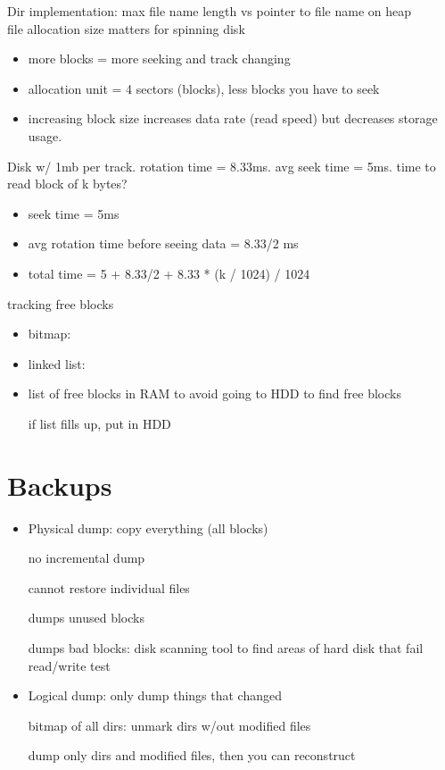 \documentclass[11pt]{article}
\begin{document}
Dir implementation: max file name length vs pointer to file name on heap \\

file allocation size matters for spinning disk
\begin{itemize}
    \item more blocks = more seeking and track changing
    \item allocation unit = 4 sectors (blocks), less blocks you have to seek
    \item increasing block size increases data rate (read speed) but decreases storage usage.
\end{itemize}

Disk w/ 1mb per track. rotation time = 8.33ms. avg seek time = 5ms. time to read block of k bytes?
\begin{itemize}
    \item seek time = 5ms
    \item avg rotation time before seeing data = 8.33/2 ms
    \item total time = 5 + 8.33/2 + 8.33 * (k / 1024) / 1024\\
\end{itemize}

tracking free blocks
\begin{itemize}
    \item bitmap:
    \item linked list: 
    \item list of free blocks in RAM to avoid going to HDD to find free blocks

        if list fills up, put in HDD
\end{itemize}


\section{Backups}
\begin{itemize}
    \item Physical dump: copy everything (all blocks)

        no incremental dump

        cannot restore individual files

        dumps unused blocks

        dumps bad blocks: disk scanning tool to find areas of hard disk that fail read/write test

    \item Logical dump: only dump things that changed

        bitmap of all dirs: unmark dirs w/out modified files

        dump only dirs and modified files, then you can reconstruct
\end{itemize}
\end{document}
